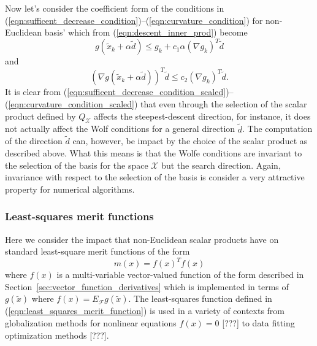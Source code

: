 Now let's consider the coefficient form of the conditions in
(\ref{eqn:sufficent_decrease_condition})--(\ref{eqn:curvature_condition}) for
non-Euclidean basis' which from (\ref{eqn:descent_inner_prod}) become
%
\begin{equation}
g(\tilde{x}_k + \alpha \tilde{d}) \le g_k + c_1 \alpha (\nabla g_k)^T \tilde{d}
\label{eqn:sufficent_decrease_condition_scaled}
\end{equation}
%
and
%
\begin{equation}
(\nabla g(\tilde{x}_k + \alpha \tilde{d}))^T \tilde{d} \le c_2 (\nabla g_k)^T \tilde{d}.
\label{eqn:curvature_condition_scaled}
\end{equation}
%
It is clear from
(\ref{eqn:sufficent_decrease_condition_scaled})--(\ref{eqn:curvature_condition_scaled})
that even through the selection of the scalar product defined by
$Q_{\mathcal{X}}$ affects the steepest-descent direction, for instance, it
does not actually affect the Wolf conditions for a general direction
$\tilde{d}$.  The computation of the direction $\tilde{d}$ can, however, be
impact by the choice of the scalar product as described above.  What this
means is that the Wolfe conditions are invariant to the selection of the basis
for the space $\mathcal{X}$ but the search direction.  Again, invariance with
respect to the selection of the basis is consider a very attractive property
for numerical algorithms.

\subsubsection{Least-squares merit functions}

Here we consider the impact that non-Euclidean scalar products have on
standard least-square merit functions of the form
%
\begin{equation}
m(x) = f(x)^T f(x)
\label{eqn:least_squares_merit_function}
\end{equation}
%
where $f(x)$ is a multi-variable vector-valued function of the form described
in Section~\ref{sec:vector_function_derivatives} which is implemented in terms
of $g(\tilde{x})$ where $f(x) = E_{\mathcal{F}} g(\tilde{x})$.  The
least-squares function defined in (\ref{eqn:least_squares_merit_function}) is
used in a variety of contexts from globalization methods for nonlinear
equations $f(x)=0$ [???] to data fitting optimization methods [???].

